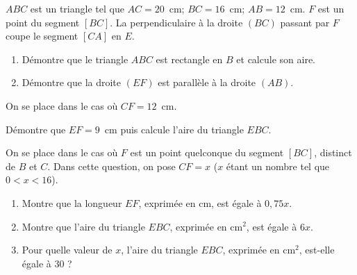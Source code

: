 $ABC$ est un triangle tel que $AC=20$~cm; $BC=16$~cm;
$AB=12$~cm. $F$ est un point du segment $[BC]$. La perpendiculaire à
la droite $(BC)$ passant par $F$ coupe le segment $[CA]$ en $E$.
\begin{myenumerate}
\item
\begin{enumerate}
\item Démontre que le triangle $ABC$ est rectangle en $B$ et calcule
son aire.
\item Démontre que la droite $(EF)$ est parallèle à la droite $(AB)$.
\end{enumerate}
\item On se place dans le cas où $CF=12$~cm.
\par Démontre que $EF=9$~cm puis calcule l'aire du triangle $EBC$.
\item On se place dans le cas où $F$ est un point quelconque du
segment $[BC]$, distinct de $B$ et $C$. Dans cette question, on pose
$CF=x$ ($x$ étant un nombre tel que $0<x<16$).
\begin{enumerate}
\item Montre que la longueur $EF$, exprimée en cm, est égale à $0,75x$.
\item Montre que l'aire du triangle $EBC$, exprimée en cm$^2$, est
égale à $6x$.
\item Pour quelle valeur de $x$, l'aire du triangle $EBC$, exprimée en
cm$^2$, est-elle égale à 30 ?
\end{enumerate}
\end{myenumerate}
